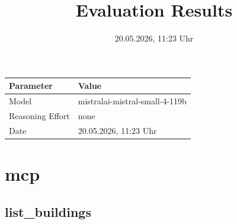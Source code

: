 \documentclass[a4paper,11pt]{article}
\title{Evaluation Results}
\date{20.05.2026, 11:23 Uhr}
\begin{document}
\maketitle

\begin{table}[H]
\centering
\begin{tabular}{l l}
\toprule
\textbf{Parameter} & \textbf{Value} \\
\midrule
Model & mistralai-mistral-small-4-119b \\
Reasoning Effort & none \\
Date & 20.05.2026, 11:23 Uhr \\
\bottomrule
\end{tabular}
\end{table}

\tableofcontents
\clearpage

\section{mcp}

\subsection{list\_buildings}
\end{document}
